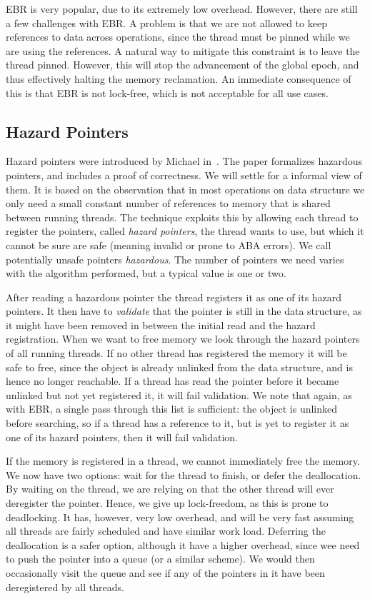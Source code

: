 EBR is very popular, due to its extremely low overhead.  However, there are still a few challenges
with EBR\@. A problem is that we are not allowed to keep references to data across operations,
since the thread must be pinned while we are using the references. A natural way to mitigate this
constraint is to leave the thread pinned. However, this will stop the advancement of the global
epoch, and thus effectively halting the memory reclamation. An immediate consequence of this is
that EBR is not lock-free, which is not acceptable for all use cases.

\subsection{Hazard Pointers\label{sec:background-hazard}}

Hazard pointers were introduced by Michael in~\cite{michael2004hazard}.  The paper formalizes
hazardous pointers, and includes a proof of correctness. We will settle for a informal view of
them. It is based on the observation that in most operations on data structure we only need a small
constant number of references to memory that is shared between running threads. The technique
exploits this by allowing each thread to register the pointers, called \emph{hazard pointers}, the
thread wants to use, but which it cannot be sure are safe (meaning invalid or prone to ABA errors).
We call potentially unsafe pointers \emph{hazardous}. The number of pointers we need varies with
the algorithm performed, but a typical value is one or two.

After reading a hazardous pointer the thread registers it as one of its hazard pointers. It then
have to \emph{validate} that the pointer is still in the data structure, as it might have been
removed in between the initial read and the hazard registration. When we want to free memory we
look through the hazard pointers of all running threads. If no other thread has registered the
memory it will be safe to free, since the object is already unlinked from the data structure, and
is hence no longer reachable. If a thread has read the pointer before it became unlinked but not
yet registered it, it will fail validation.  We note that again, as with EBR, a single pass through
this list is sufficient: the object is unlinked before searching, so if a thread has a reference to
it, but is yet to register it as one of its hazard pointers, then it will fail validation.

If the memory is registered in a thread, we cannot immediately free the memory.  We now have two
options: wait for the thread to finish, or defer the deallocation.  By waiting on the thread, we
are relying on that the other thread will ever deregister the pointer. Hence, we give up
lock-freedom, as this is prone to deadlocking. It has, however, very low overhead, and will be very
fast assuming all threads are fairly scheduled and have similar work load.  Deferring the
deallocation is a safer option, although it have a higher overhead, since wee need to push the
pointer into a queue (or a similar scheme). We would then occasionally visit the queue and see if
any of the pointers in it have been deregistered by all threads.

